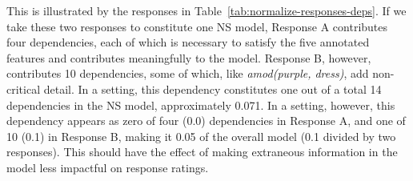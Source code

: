 This is illustrated by the responses in Table~\ref{tab:normalize-responses-deps}. If we take these two responses to constitute one NS model, Response A contributes four dependencies, each of which is necessary to satisfy the five annotated features and contributes meaningfully to the model. Response B, however, contributes 10 dependencies, some of which, like \textit{amod(purple, dress)}, add non-critical detail. In a  setting, this dependency constitutes one out of a total 14 dependencies in the NS model, approximately 0.071. In a  setting, however, this dependency appears as zero of four (0.0) dependencies in Response A, and one of 10 (0.1) in Response B, making it 0.05 of the overall model (0.1 divided by two responses). This should have the effect of making extraneous information in the model less impactful on response ratings.

